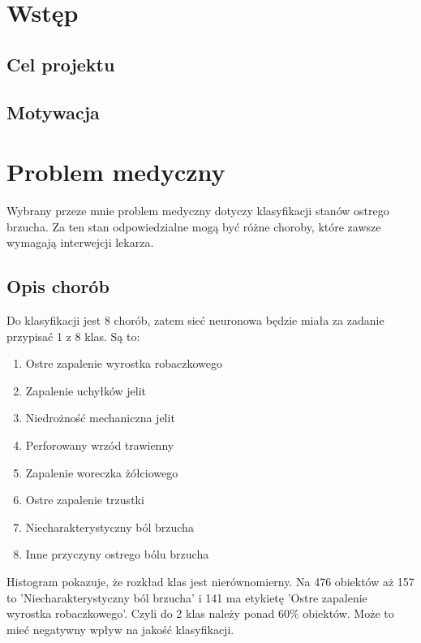 \documentclass{report}
\begin{document}
    \tableofcontents

    \chapter{Wstęp}

    \section{Cel projektu}

    \section{Motywacja}

    \chapter{Problem medyczny}

    Wybrany przeze mnie problem medyczny dotyczy klasyfikacji stanów ostrego brzucha.
    Za ten stan odpowiedzialne mogą być różne choroby, które zawsze wymagają interwejcji lekarza.

    \section{Opis chorób}

    Do klasyfikacji jest 8 chorób, zatem sieć neuronowa będzie miała za zadanie przypisać 1 z 8 klas.
    Są to:
    \begin{enumerate}
        \item Ostre zapalenie wyrostka robaczkowego
        \item Zapalenie uchyłków jelit
        \item Niedrożność mechaniczna jelit
        \item Perforowany wrzód trawienny
        \item Zapalenie woreczka żółciowego
        \item Ostre zapalenie trzustki
        \item Niecharakterystyczny ból brzucha
        \item Inne przyczyny ostrego bólu brzucha
    \end{enumerate}

    Histogram pokazuje, że rozkład klas jest nierównomierny.
    Na 476 obiektów aż 157 to 'Niecharakterystyczny ból brzucha' i 141 ma etykietę 'Ostre zapalenie wyrostka robaczkowego'.
    Czyli do 2 klas należy ponad 60\% obiektów.
    Może to mieć negatywny wpływ na jakość klasyfikacji.
\end{document}
